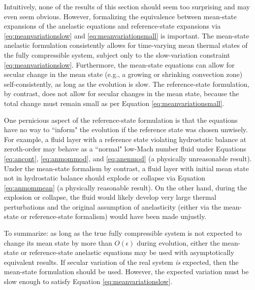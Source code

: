 \documentclass[12pt]{article}
\begin{document}
Intuitively, none of the results of this section should seem too surprising and may even seem obvious. However, formalizing the equivalence between mean-state expansions of the anelastic equations and reference-state expansions via \eqref{eq:meanvariationslow} and \eqref{eq:meanvariationsmall} is important. The mean-state anelastic formulation consistently allows for time-varying mean thermal states of the fully compressible system, subject only to the slow-variation constraint \eqref{eq:meanvariationslow}. Furthermore, the mean-state equations can allow for secular change in the mean state (e.g., a growing or shrinking convection zone) self-consistently, as long as the evolution is slow. The reference-state formulation, by contrast, does not allow for secular changes in the mean state, because the total change must remain small as per Equation \eqref{eq:meanvariationsmall}.

One pernicious aspect of the reference-state formulation is that the equations have no way to ``inform" the evolution if the reference state was chosen unwisely. For example, a fluid layer with a reference state violating hydrostatic balance at zeroth-order may behave as a ``normal" low-Mach number fluid under Equations \eqref{eq:ancont}, \eqref{eq:anmommod}, and \eqref{eq:anenmod} (a physically unreasonable result). Under the mean-state formalism by contrast, a fluid layer with initial mean state not in hydrostatic balance should explode or collapse via Equation \eqref{eq:anmommean} (a physically reasonable result). On the other hand, during the explosion or collapse, the fluid would likely develop very large thermal perturbations and the original assumption of anelasticity (either via the mean-state or reference-state formalism) would have been made unjustly. 

To summarize: as long as the true fully compressible system is not expected to change its mean state by more than $O(\epsilon)$ during evolution, either the mean-state or reference-state anelastic equations may be used with asymptotically equivalent results. If secular variation of the real system \textit{is} expected, then the mean-state formulation should be used. However, the expected variation must be slow enough to satisfy Equation \eqref{eq:meanvariationslow}. %


\end{document}
